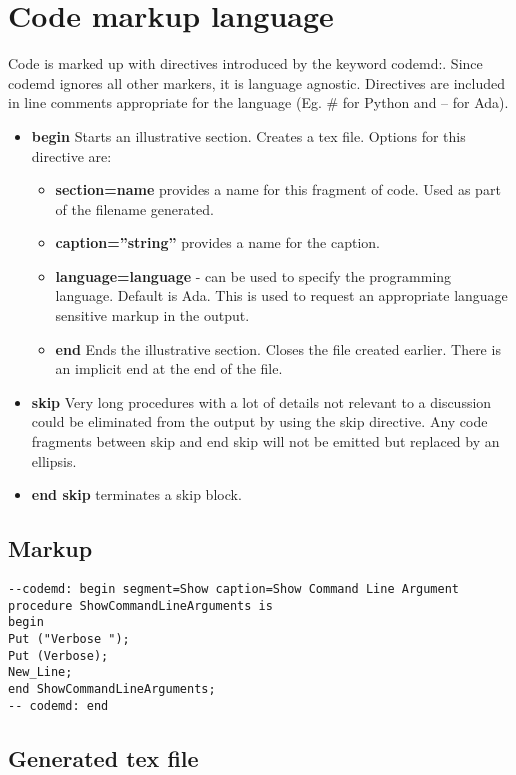 \documentclass[12pt, a4paper]{article}
\begin{document}
\section{Code markup language}
Code is marked up with directives introduced by the keyword codemd:. Since codemd ignores all other markers, it is language agnostic. Directives are included in line comments appropriate for the language (Eg. \# for Python and – for Ada).
\begin{itemize}

    \item \textbf{begin} Starts an illustrative section. Creates a tex file. Options for this directive are:
    \begin{itemize}
        \item \textbf{section=name} provides a name for this fragment of code. Used as part of the filename generated.
        \item \textbf{caption=”string”} provides a name for the caption.
        \item \textbf{language=language} - can be used to specify the programming language. Default is Ada. This is used to request an appropriate language sensitive markup in the output.
        \item \textbf{end} Ends the illustrative section. Closes the file created earlier. There is an implicit end at the end of the file.
    \end{itemize}
\item \textbf{skip} Very long procedures with a lot of details not relevant to a discussion could be eliminated from the output by using the skip directive. Any code fragments between skip and end skip will not be emitted but replaced by an ellipsis.

\item \textbf{end skip} terminates a skip block.
\end{itemize}

\subsection{Markup}
\begin{verbatim}
--codemd: begin segment=Show caption=Show Command Line Argument 
procedure ShowCommandLineArguments is
begin
Put ("Verbose ");
Put (Verbose);
New_Line;
end ShowCommandLineArguments;
-- codemd: end
\end{verbatim}
\subsection{Generated tex file}
\end{document}

